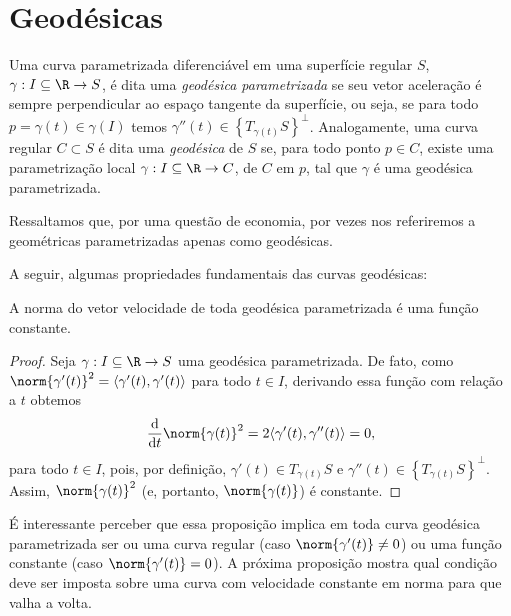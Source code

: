 \section{Geodésicas}

\begin{defn}
    Uma curva parametrizada diferenciável em uma superfície regular \( S \), \( \gamma : I \subseteq \R \to S \), é dita uma \emph{geodésica parametrizada} se seu vetor aceleração é sempre perpendicular ao espaço tangente da superfície, ou seja, se para todo \( p = \gamma ( t ) \in \gamma ( I ) \) temos \( \gamma'' ( t ) \in \left\{ T_{ \gamma ( t ) } S \right\}^{ \perp } \).
    Analogamente, uma curva regular \( C \subset S \) é dita uma \emph{geodésica} de \( S \) se, para todo ponto \( p \in C \), existe uma parametrização local \( \gamma : I \subseteq \R \to C \), de \( C \) em \( p \), tal que \( \gamma \) é uma geodésica parametrizada.
\end{defn}

Ressaltamos que, por uma questão de economia, por vezes nos referiremos a geométricas parametrizadas apenas como geodésicas.

A seguir, algumas propriedades fundamentais das curvas geodésicas:
\begin{prop}
    A norma do vetor velocidade de toda geodésica parametrizada é uma função constante.
    \label{geonorm}
\end{prop}
\begin{proof}
    Seja \( \gamma : I \subseteq \R \to S \) uma geodésica parametrizada.
    De fato, como \( \norm{ \gamma' ( t ) }^2 = \dotprod{ \gamma' ( t ), \gamma' ( t ) } \) para todo \( t \in I \), derivando essa função com relação a \( t \) obtemos
    \begin{equation*}
        \frac{ \mathrm d }{ \mathrm d t } \norm{ \gamma ( t ) }^2
        = 2 \dotprod{ \gamma' ( t ), \gamma'' ( t ) } = 0
    ,\end{equation*}
    para todo \( t \in I \), pois, por definição, \( \gamma' ( t ) \in T_{ \gamma ( t ) } S \) e \( \gamma'' ( t ) \in \left\{ T_{ \gamma ( t ) } S \right\}^{ \perp } \).
    Assim, \( \norm{ \gamma ( t ) }^2 \) (e, portanto, \( \norm{ \gamma ( t ) } \)) é constante.
\end{proof}

É interessante perceber que essa proposição implica em toda curva geodésica parametrizada ser ou uma curva regular (caso \( \norm{ \gamma' ( t ) } \neq 0 \)) ou uma função constante (caso \( \norm{ \gamma' ( t ) } = 0 \)).
A próxima proposição mostra qual condição deve ser imposta sobre uma curva com velocidade constante em norma para que valha a volta.

